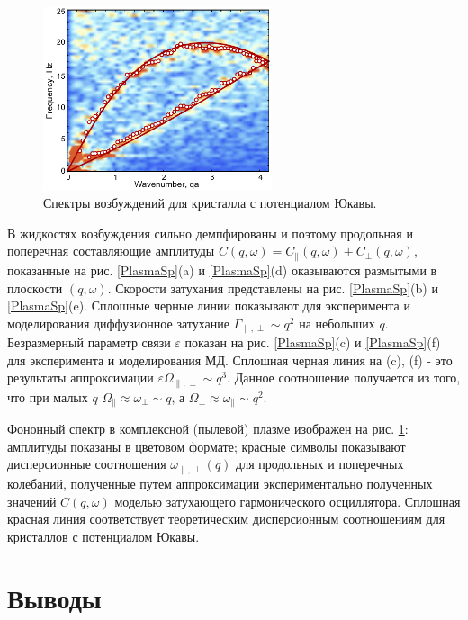 \begin{figure}[htbp]
\begin{center}
\includegraphics[width=0.6\textwidth]{Ris/Plasma_SP_1.pdf}
\caption{Спектры возбуждений для кристалла с потенциалом Юкавы.}
\label{PlasmaSp2}
\end{center}
\end{figure}

В жидкостях возбуждения сильно демпфированы и поэтому продольная и поперечная составляющие амплитуды $C(q, \omega) = C_{\parallel}(q, \omega) + C_{\perp}(q, \omega)$, показанные на рис.  \ref{PlasmaSp}(a) и  \ref{PlasmaSp}(d) оказываются размытыми в плоскости $(q,\omega)$.  Скорости затухания представлены на рис.  \ref{PlasmaSp}(b) и \ref{PlasmaSp}(e). Сплошные черные линии показывают для эксперимента и моделирования диффузионное затухание $\Gamma_{\parallel, \perp} \sim q^2$ на небольших $q$. Безразмерный параметр связи $\varepsilon$ показан на рис.  \ref{PlasmaSp}(c) и \ref{PlasmaSp}(f) для эксперимента и моделирования МД. Сплошная черная линия на (c), (f) -  это результаты аппроксимации $\varepsilon \Omega_{\parallel, \perp} \sim q^3$. Данное соотношение получается из того, что при малых $q$ $ \Omega_{\parallel} \approx   \omega_{\perp} \sim q$, а $\Omega_{\perp} \approx   \omega_{\parallel} \sim q^2$.



Фононный спектр в комплексной (пылевой) плазме изображен на рис. \ref{PlasmaSp2}: амплитуды показаны в цветовом формате; красные символы показывают дисперсионные соотношения $\omega_{\parallel, \perp}(q)$ для продольных и поперечных колебаний, полученные путем аппроксимации экспериментально полученных значений $C(q, \omega)$ моделью затухающего гармонического осциллятора. Сплошная красная линия соответствует теоретическим дисперсионным соотношениям для кристаллов с потенциалом Юкавы.


\section{Выводы}

